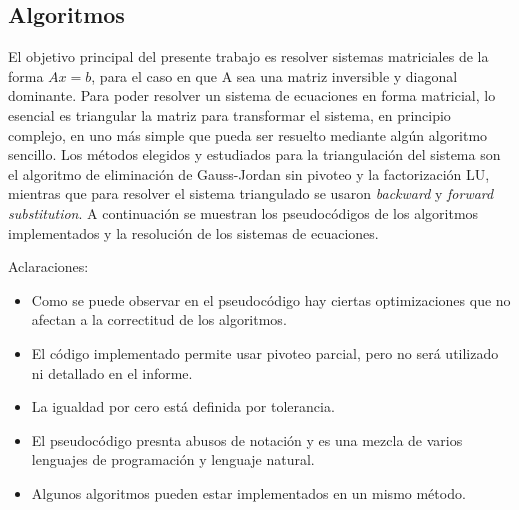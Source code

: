 \subsection{Algoritmos}

El objetivo principal del presente trabajo es resolver sistemas matriciales de la forma $Ax = b$, para el caso en que A sea una matriz inversible y diagonal dominante. Para poder resolver un sistema de ecuaciones en forma matricial, lo esencial es triangular la matriz para transformar el sistema, en principio complejo, en uno más simple que pueda ser resuelto mediante algún algoritmo sencillo.
Los métodos elegidos y estudiados para la triangulación del sistema son el algoritmo de eliminación de Gauss-Jordan sin pivoteo y la factorización LU, mientras que para resolver el sistema triangulado se usaron \emph{backward} y \emph{forward} \emph{substitution}. A continuación se muestran los pseudocódigos de los algoritmos implementados y la resolución de los sistemas de ecuaciones.



Aclaraciones:
\begin{itemize}
\item Como se puede observar en el pseudocódigo hay ciertas optimizaciones que no afectan a la correctitud de los algoritmos.
\item El código implementado permite usar pivoteo parcial, pero no será utilizado ni detallado en el informe.
\item La igualdad por cero está definida por tolerancia.
\item El pseudocódigo presnta abusos de notación y es una mezcla de varios lenguajes de programación y lenguaje natural.
\item Algunos algoritmos pueden estar implementados en un mismo método.
\end{itemize}







